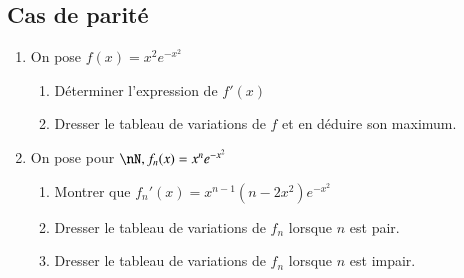 \documentclass[oneside,12pt]{article}          %
\begin{document}
\subsection{Cas de parité}
\begin{enumerate}
    \item On pose $f(x)=x^2e^{-x^2}$
    \begin{enumerate}
        \item Déterminer l'expression de $f'(x)$
        \item Dresser le tableau de variations de $f$ et en déduire son maximum.
    \end{enumerate}
    \item On pose pour $\nN, f_n(x)=x^ne^{-x^2}$
    \begin{enumerate}
        \item Montrer que $f_n'(x)=x^{n-1}\left(n-2x^2\right)e^{-x^2}$
        \item Dresser le tableau de variations de $f_n$ lorsque $n$ est pair.
        \item Dresser le tableau de variations de $f_n$ lorsque $n$ est impair.
    \end{enumerate}
\end{enumerate}
\end{document}
